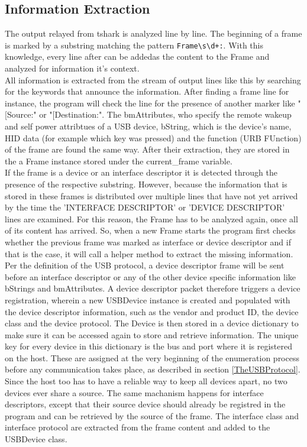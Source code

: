 \subsection{Information Extraction}

The output relayed from tshark is analyzed line by line. The beginning of a frame is marked by a substring matching the pattern \verb|Frame\s\d+:|. With this knowledge, every line after can be addedas the content to the Frame and analyzed for information it's context. \\ 
All information is extracted from the stream of output lines like this by searching for the keywords that announce the information. After finding a frame line for instance, the program will check the line for the presence of another marker like "[Source:" or "[Destination:". The bmAttributes, who specify the remote wakeup and self power attribtues of a USB device, bString, which is the device's name, HID data (for example which key was pressed) and the function (URB FUnction) of the frame are found the same way. After their extraction, they are stored in the a Frame instance stored under the current_frame variable. \\
If the frame is a device or an interface descriptor it is detected through the presence of the respective substring. However, because the information that is stored in these frames is distributed over multiple lines that have not yet arrived by the time the 'INTERFACE DESCRIPTOR' or 'DEVICE DESCRIPTOR'  lines are examined. For this reason, the Frame has to be analyzed again, once all of its content has arrived. So, when a new Frame starts the program first checks whether the previous frame was marked as interface or device descriptor and if that is the case, it will call a helper method to extract the missing information. \\
Per the definition of the USB protocol, a device descriptor frame will be sent before an interface descriptor or any of the other device specific information like bStrings and bmAttributes. A device descriptor packet therefore triggers a device registration, wherein a new USBDevice instance is created and populated with the device descriptor information, such as the vendor and product ID, the device class and the device protocol. The Device is then stored in a device dictionary to make sure it can be accessed again to store and retrieve information. The unique key for every device in this dictionary is the bus and port where it is registered on the host. These are assigned at the very beginning of the enumeration process before any communication takes place, as described in section \ref{TheUSBProtocol}. Since the host too has to have a reliable way to keep all devices apart, no two devices ever share a source. The same machanism happens for interface descriptors, except that their source device should already be registred in the program and can be retrieved by the source of the frame. The interface class and interface protocol are extracted from the frame content and added to the USBDevice class.\\
